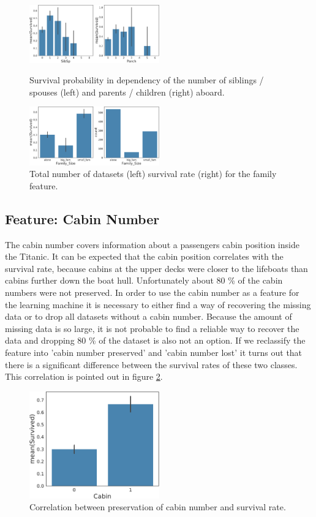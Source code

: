    \begin{figure}
 \centering
     \includegraphics[width=0.5\textwidth]{media_saved/family_size_before}
     \caption{Survival probability in dependency of the number of siblings / spouses (left) and parents / children (right) aboard.}
     \label{fig:familyold}
     \includegraphics[width=0.5\textwidth]{media_saved/family_size_after}
     \caption{Total number of datasets (left) survival rate (right) for the family feature.}
     \label{fig:familynew}
 \end{figure}
 
\subsection{Feature: Cabin Number}
The cabin number covers information about a passengers cabin position inside the Titanic. It can be expected that the cabin position correlates with the survival rate, because cabins at the upper decks were closer to the lifeboats than cabins further down the boat hull. Unfortunately about 80 \% of the cabin numbers were not preserved. In order to use the cabin number as a feature for the learning machine it is necessary to either find a way of recovering the missing data or to drop all datasets without a cabin number. Because the amount of missing data is so large, it is not probable to find a reliable way to recover the data and dropping 80 \% of the dataset is also not an option. If we reclassify the feature into 'cabin number preserved' and 'cabin number lost' it turns out that there is a significant difference between the survival rates of these two classes. This correlation is pointed out in figure \ref{fig:cabinfeat}.

\begin{figure}
 \centering
     \includegraphics[width=0.5\textwidth]{media_saved/cabin_survived}
     \caption{Correlation between preservation of cabin number and survival rate.}
     \label{fig:cabinfeat}
 \end{figure}

